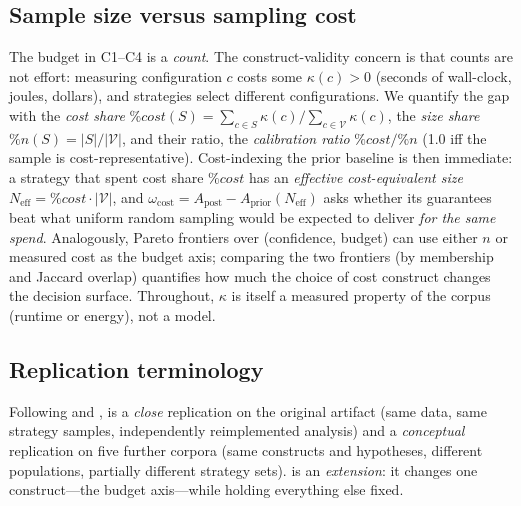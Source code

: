 \subsection{Sample size versus sampling cost}
\label{sec:costargument}

The budget in C1--C4 is a \emph{count}. The construct-validity concern is
that counts are not effort: measuring configuration $c$ costs some
$\kappa(c) > 0$ (seconds of wall-clock, joules, dollars), and strategies
select different configurations. We quantify the gap with the \emph{cost
share}
$\%cost(S) = \sum_{c\in S}\kappa(c) / \sum_{c\in\mathcal{V}}\kappa(c)$,
the \emph{size share} $\%n(S) = |S|/|\mathcal{V}|$, and their ratio, the
\emph{calibration ratio} $\%cost/\%n$ (1.0 iff the sample is
cost-representative). Cost-indexing the prior baseline is then immediate:
a strategy that spent cost share $\%cost$ has an \emph{effective
cost-equivalent size} $N_{\mathrm{eff}} = \%cost \cdot |\mathcal{V}|$,
and $\omega_{\mathrm{cost}} = A_{\mathrm{post}} -
A_{\mathrm{prior}}(N_{\mathrm{eff}})$ asks whether its guarantees beat
what uniform random sampling would be expected to deliver \emph{for the
same spend}. Analogously, Pareto frontiers over (confidence, budget) can
use either $n$ or measured cost as the budget axis; comparing the two
frontiers (by membership and Jaccard overlap) quantifies how much the
choice of cost construct changes the decision surface. Throughout,
$\kappa$ is itself a measured property of the corpus (runtime or energy),
not a model.

\subsection{Replication terminology}

Following \citet{shull2008role} and \citet{gomez2014understanding}, \rqone{}
is a \emph{close} replication on the original artifact (same data, same
strategy samples, independently reimplemented analysis) and a
\emph{conceptual} replication on five further corpora (same constructs
and hypotheses, different populations, partially different strategy
sets). \rqtwo{} is an \emph{extension}: it changes one construct---the
budget axis---while holding everything else fixed.
